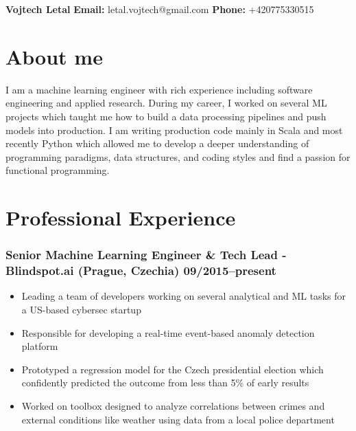 \documentclass[11pt]{article}
\begin{document}
\clearpage
\thispagestyle{empty}
{\center\bfseries\huge Vojtech Letal}
\hfill
{\bf Email:} letal.vojtech@gmail.com
{\bf Phone:} +420775330515

\section*{About me}
I am a machine learning engineer with rich experience including software engineering and applied research.
During my career, I worked on several ML projects which taught me how to build a data processing pipelines and push models into production.
I am writing production code mainly in Scala and most recently Python which allowed me to develop a deeper understanding of programming paradigms, data structures, and coding styles and find a passion for functional programming.

\section*{Professional Experience}
\subsubsection*{\bf Senior Machine Learning Engineer \& Tech Lead - Blindspot.ai (Prague, Czechia) \hfill 09/2015--present}
	 \begin{itemize}
		\setlength\itemsep{-0.25em}
		\item Leading a team of developers working on several analytical and ML tasks for a US-based cybersec startup
		\item Responsible for developing a real-time event-based anomaly detection platform
		\item Prototyped a regression model for the Czech presidential election which confidently predicted the outcome from less than 5\% of early results
		\item Worked on toolbox designed to analyze correlations between crimes and external conditions like weather using data from a local police department
	 \end{itemize}
\end{document}
